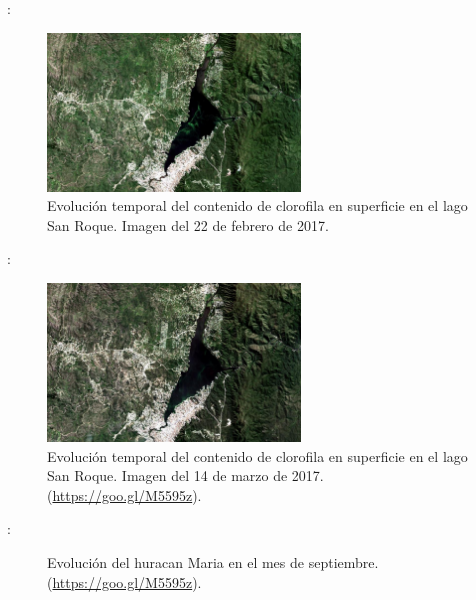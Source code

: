 \documentclass[handout,aspectratio=169]{beamer}
\begin{document}
\begin{frame}{\secname : \subsecname}
    \begin{figure}[h!]
        \centering
        \includegraphics[width=0.6\textwidth]{fig:lake-end.jpeg}
        \caption{Evolución temporal del contenido de clorofila en superficie en el lago San Roque. Imagen del 22 de febrero de 2017.}
        \label{fig:lake-end}
    \end{figure}
\end{frame}

\begin{frame}{\secname : \subsecname}
    \begin{figure}[h!]
        \centering
        \includegraphics[width=0.6\textwidth]{fig:lake-aft.jpeg}
        \caption{Evolución temporal del contenido de clorofila en superficie en el lago San Roque. Imagen del 14 de marzo de 2017. (\href{https://goo.gl/M5595z}{https://goo.gl/M5595z}).}
        \label{fig:lake-aft}
    \end{figure}
\end{frame}

\begin{frame}{\secname : \subsecname}
    \begin{figure}[h!]
    \centering
    \caption{Evolución del huracan Maria en el mes de septiembre. (\href{https://goo.gl/M5595z}{https://goo.gl/M5595z}).}
    \end{figure}
\end{frame}
\end{document}
